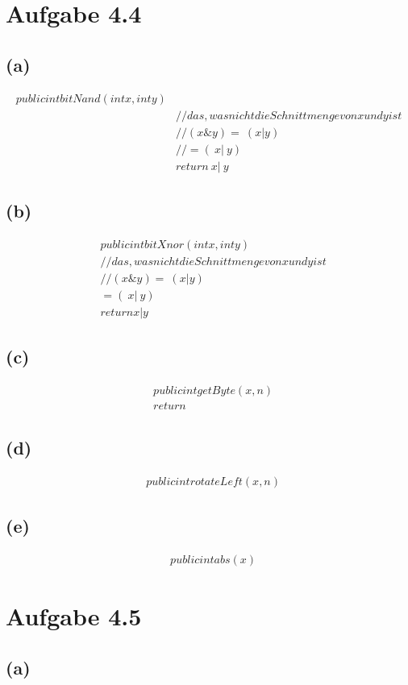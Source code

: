 \documentclass[12pt]{article}
\begin{document}
\section{Aufgabe 4.4}
\subsection{(a)}
\begin{align}
public int bitNand(int x,int y)\\
&// das, was nicht die Schnittmenge von x und y ist\\
&// (x\& y)  = ~ (x | y)\\
&// = (~ x | ~ y)\\
&return  ~ x | ~ y
\end{align}

\subsection{(b)}
\begin{align}
&public int bitXnor(int x,int y)\\
&// das, was nicht die Schnittmenge von x und y ist\\
&// (x\& y)  = ~ (x | y)\\
&= (~ x | ~ y)\\
&return x | y
\end{align}

\subsection{(c)}
\begin{align}
&public int getByte(x,n)\\
&return
\end{align}
\subsection{(d)}
\begin{align}
&public int rotateLeft(x,n)
\end{align}
\subsection{(e)}
\begin{align}
&public int abs(x)
\end{align}


\section{Aufgabe 4.5}
\subsection{(a)}
\begin{align}
\end{align}
\end{document}
